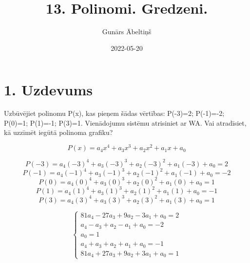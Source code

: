 \documentclass{article}
\title{13. Polinomi. Gredzeni.}
\author{Gunārs Ābeltiņš}
\date{2022-05-20}
\begin{document}
\maketitle

\section*{1. Uzdevums}
Uzbūvējiet polinomu P(x), kas pieņem šādas vērtības: P(-3)=2; P(-1)=-2; P(0)=1; P(1)=-1; P(3)=1. Vienādojumu sistēmu atrisiniet ar WA. Vai atradīsiet, kā uzzīmēt iegūtā polinoma grafiku?

\begin{equation*}
    P(x) = a_4 x^4 + a_3 x^3 + a_2 x^2 + a_1 x + a_0
\end{equation*}

\begin{equation*}
    P(-3) = a_4 (-3)^4 + a_3 (-3)^3 + a_2 (-3)^2 + a_1 (-3) + a_0 = 2
\end{equation*}
\begin{equation*}
    P(-1) = a_4 (-1)^4 + a_3 (-1)^3 + a_2 (-1)^2 + a_1 (-1) + a_0 = -2
\end{equation*}
\begin{equation*}
    P(0) = a_4 (0)^4 + a_3 (0)^3 + a_2 (0)^2 + a_1 (0) + a_0 = 1
\end{equation*}
\begin{equation*}
    P(1) = a_4 (1)^4 + a_3 (1)^3 + a_2 (1)^2 + a_1 (1) + a_0 = -1
\end{equation*}
\begin{equation*}
    P(3) = a_4 (3)^4 + a_3 (3)^3 + a_2 (3)^2 + a_1 (3) + a_0 = 1
\end{equation*}

\begin{equation*}
    \begin{cases}
        81a_4 - 27a_3 + 9a_2 - 3a_1 + a_0 = 2 \\
        a_4 - a_3 + a_2 - a_1 + a_0 = -2 \\
        a_0 = 1 \\
        a_4 + a_3 + a_2 + a_1 + a_0 = -1 \\
        81a_4 + 27a_3 + 9a_2 + 3a_1 + a_0 = 1
    \end{cases}
\end{equation*}
\end{document}
